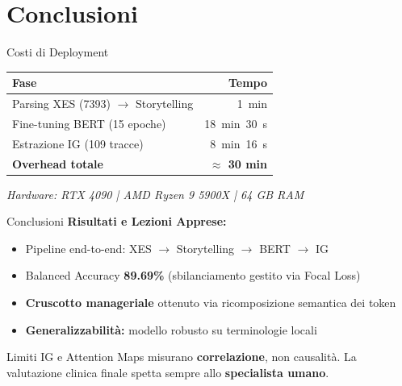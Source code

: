 \documentclass[aspectratio=169, 10pt]{beamer}
\begin{document}
\section{Conclusioni}
\begin{frame}{Costi di Deployment}
  \vspace{2em}
  \begin{center}
    \renewcommand{\arraystretch}{1.4}
    \begin{tabular}{lr}
      \toprule
      \textbf{Fase} & \textbf{Tempo} \\
      \midrule
      Parsing XES (7393) $\to$ Storytelling & 1~min \\
      Fine-tuning BERT (15 epoche) & 18~min~30~s \\
      Estrazione IG (109 tracce) & 8~min~16~s \\
      \midrule
      \textbf{Overhead totale} & \alert{\textbf{$\approx$ 30 min}} \\
      \bottomrule
    \end{tabular}

    \vspace{1.5em}
    {\small\itshape Hardware: RTX 4090 | AMD Ryzen 9 5900X | 64 GB RAM}
  \end{center}
\end{frame}

\begin{frame}{Conclusioni}
  \vspace{1em}
  \textbf{Risultati e Lezioni Apprese:}
  \begin{itemize}
    \item Pipeline end-to-end: XES $\to$ Storytelling $\to$ BERT $\to$ IG
    \item Balanced Accuracy \textbf{89.69\%} (sbilanciamento gestito via Focal Loss)
    \item \textbf{Cruscotto manageriale} ottenuto via ricomposizione semantica dei token
    \item \textbf{Generalizzabilità:} modello robusto su terminologie locali
  \end{itemize}

  \vspace{1.5em}
  \begin{alertblock}{Limiti}
    IG e Attention Maps misurano \textbf{correlazione},
    non causalità. La valutazione clinica finale
    spetta sempre allo \textbf{\alert{specialista umano}}.
  \end{alertblock}
\end{frame}
\end{document}

